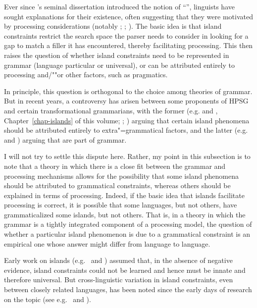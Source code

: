 \documentclass[output=paper
	        ,collection
	        ,collectionchapter
 	        ,biblatex
                ,babelshorthands
                ,newtxmath
                ,draftmode
                ,colorlinks, citecolor=brown
]{langscibook}
\begin{document}
Ever since \citeauthor{Ross67}'s seminal dissertation \citeyearpar{Ross67} introduced the notion of ``'', linguists have sought explanations for their existence, often suggesting that they were motivated by processing considerations (notably \citealt{Grosu72-u}; \citealt{Fodor83}; \citealt{Deane91}).  The basic idea is that island constraints restrict the search space the parser needs to consider in looking for a gap to match a filler it has encountered, thereby facilitating processing.  This then raises the question of whether island constraints need to be represented in grammar (language particular or universal), or can be attributed entirely to processing and/""or other factors, such as pragmatics.

In principle, this question is orthogonal to the choice among theories of grammar.  But in recent
years, a controversy has arisen between some proponents of HPSG and certain transformational
grammarians, with the former (e.g. \citeauthor{Chaves2012} \citeyear{Chaves2012} and
\citeyear{chapters/islands}, Chapter~\ref{chap-islands} of this volume; \citealt{HofmeisterSag2010}; \citealt*{HofmeisterEtal2013}) arguing that certain island phenomena should be attributed entirely to extra"=grammatical factors, and the latter (e.g.\ \citealt{Phillips2013} and \citealt{SWP2012a-u}) arguing that  are part of grammar.

I will not try to settle this dispute here.  Rather, my point in this subsection is to note that a theory in which there is a close fit between the grammar and processing mechanisms allows for the possibility that some island phenomena should be attributed to grammatical constraints, whereas others should be explained in terms of processing.  Indeed, if the basic idea that islands facilitate processing is correct, it is possible that some languages, but not others, have grammaticalized some islands, but not others.  That is, in a theory in which the grammar is a tightly integrated component of a processing model, the question of whether a particular island phenomenon is due to a grammatical constraint is an empirical one whose answer might differ from language to language. 

Early work on islands (e.g.\ \citealt{Ross67} and \citealt{Chomsky73a}) assumed that, in the absence of negative evidence, island constraints could not be learned and hence must be innate and therefore universal.  But cross-linguistic variation in island constraints, even between closely related languages, has been noted since the early days of research on the topic (see e.g.\ \citealt{Erteschik73a-u} and \citealt{EngdahlEjerhed82}).
\end{document}

